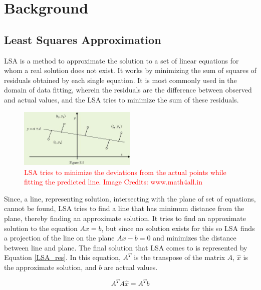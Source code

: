 \documentclass[times,twocolumn,final,authoryear]{elsarticle}
\begin{document}
	\section{Background}\label{Sec_Background}
	\subsection{Least Squares Approximation}
	LSA is a method to approximate the solution to a set of linear equations for whom a real solution does not exist. It works by minimizing the sum of squares of residuals obtained by each single equation. It is most commonly used in the domain of data fitting, wherein the residuals are the difference between observed and actual values, and the LSA tries to minimize the sum of these residuals.
	
	\begin{figure}[!t]
		\centering
		\includegraphics[width=0.5\textwidth]{Figures/LSA.jpg}
		\caption{\textcolor{red}{LSA tries to minimize the deviations from the actual points while fitting the predicted line. Image Credits: www.math4all.in}}
		\label{LSA}
	\end{figure}
	
	
	Since, a line, representing solution, intersecting with the plane of set of equations, cannot be found, LSA tries to find a line that has minimum distance from the plane, thereby finding an approximate solution. It tries to find an approximate solution to the equation \(Ax = b\), but since no solution exists for this so LSA finds a projection of the line on the plane \(Ax - b = 0\) and minimizes the distance between line and plane. The final solution that LSA comes to is represented by Equation \ref{LSA_res}. In this equation, \(A^{T}\) is the transpose of the matrix \(A\), \(\hat{x}\) is the approximate solution, and \(b\) are actual values.
	
	\begin{equation}
		\label{LSA_res}
		A^{T}A\widehat{x}  =  A^{T}b
	\end{equation}  
	
\end{document}
